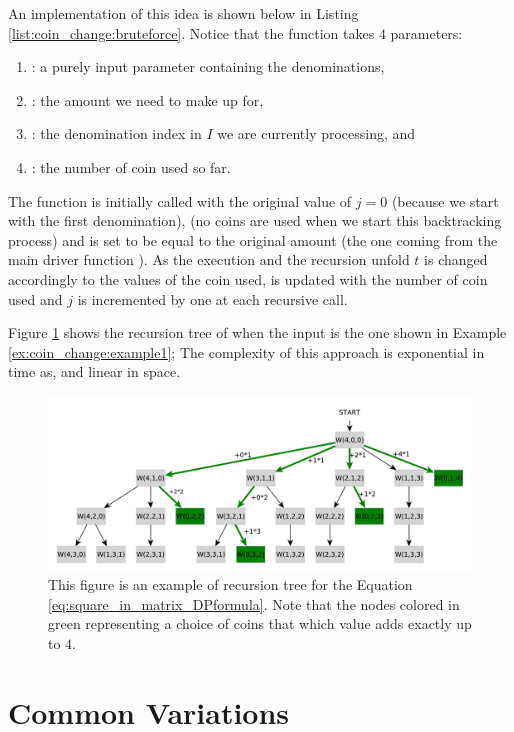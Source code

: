 An implementation of this idea is shown below in Listing \ref{list:coin_change:bruteforce}.
Notice that the function  takes $4$ parameters:
\begin{enumerate}
	\item {}: a purely input parameter containing the denominations,
	\item {}: the amount we need to make up for,
	\item {}: the denomination index in $I$ we are currently processing, and
	\item {}: the number of coin used so far.
\end{enumerate}
The function is initially called with the original value of $j=0$ (because we start with the first denomination),  (no coins are used when we start this backtracking process) and  is set to be equal to the original amount (the one coming from the main driver function ).
As the execution and the recursion unfold $t$ is changed accordingly to the values of the coin used, 
 is updated with the number of coin used and $j$ is incremented by one at each recursive call.

Figure \ref{} shows the recursion tree of  when the input is the one shown in Example \ref{ex:coin_change:example1};
The complexity of this approach is exponential in time as,
and linear in space. 
\begin{figure}
	\centering
	\label{fig:square_in_matrix:recursiontree}
	\includegraphics[width=\textwidth]{sources/coin_change/images/recursiontree}
	\caption{This figure is an example of recursion tree for the Equation
	\ref{eq:square_in_matrix_DPformula}. Note that the nodes colored in green representing a choice of coins that which value adds exactly up to $4$. }
\end{figure}











\section{Common Variations}